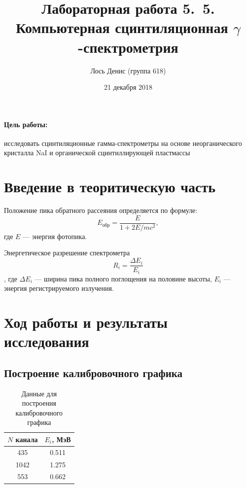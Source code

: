 \documentclass[12pt]{article}
\title{{\bf Лабораторная работа 5.\, 5. \\ Компьютерная сцинтиляционная $\gamma$-спектрометрия}}
\author{Лось Денис (группа 618)}
\date{21 декабря 2018}
\begin{document}
\maketitle

\paragraph*{Цель работы: } исследовать сцинтиляционные гамма-спектрометры на основе неорганического кристалла NaI и органической сцинтиллирующей пластмассы

\section*{Введение в теоритическую часть}
\par
	Положение пика обратного рассеяния определяется по формуле:
\[
	E_\text{обр} = \frac{E}{1 + 2E / mc^2},
\]
где $E$ --- энергия фотопика.
\par
	Энергетическое разрешение спектрометра
\[
	R_i = \frac{\Delta E_i}{E_i}
\]
, где $\Delta E_i$ --- ширина пика полного поглощения на половине высоты, $E_i$ --- энергия регистрируемого излучения.
\newpage
\section*{Ход работы и результаты исследования}

\subsection*{Построение калибровочного графика}

\begin{table}[h!]
	\centering
	\begin{tabular}{|c|c|}
	\hline
		$N$ канала & $E_i$, МэВ \\
	\hline
		435 & 0.511 \\
	\hline
		1042 & 1.275 \\
	\hline
		553 & 0.662 \\
	\hline
	\end{tabular}
	\caption{Данные для построения калибровочного графика}
\end{table}
\end{document}
